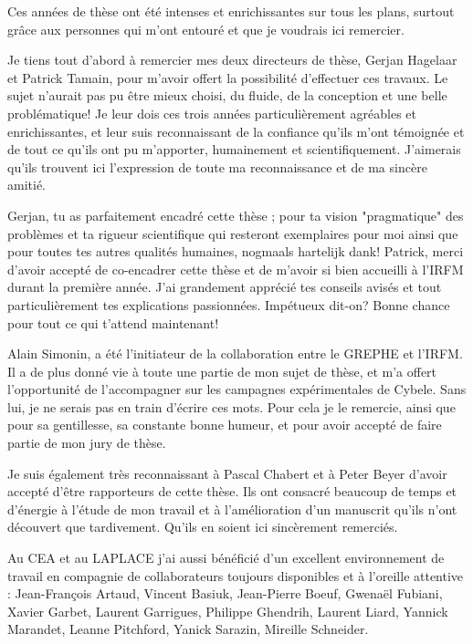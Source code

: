 \thispagestyle{preface}
\iffalse 
Ces années de thèse ont été intenses et enrichissantes sur tous
les plans, surtout grâce aux personnes qui m’ont entouré et que je voudrais ici
remercier.

Je tiens tout d'abord à remercier mes deux directeurs de thèse, Gerjan Hagelaar
et Patrick Tamain, pour m'avoir offert la possibilité d'effectuer ces travaux.
Le sujet n'aurait pas pu être mieux choisi, du fluide, de la conception et une
belle problématique! Je leur dois ces trois années
particulièrement agréables et enrichissantes, et leur suis reconnaissant de la
confiance qu'ils m'ont témoignée et de tout ce qu'ils ont pu m'apporter,
humainement et scientifiquement. J'aimerais qu'ils trouvent ici l'expression de toute ma
reconnaissance et de ma sincère amitié. 

Gerjan, tu as parfaitement encadré cette
thèse ; pour ta vision "pragmatique" des problèmes et ta rigueur
scientifique qui resteront exemplaires pour moi ainsi que pour toutes tes autres
qualités humaines, nogmaals hartelijk dank!
Patrick, merci d'avoir accepté de co-encadrer cette thèse et de m'avoir si bien
accueilli à l'IRFM durant la première année. J'ai grandement apprécié tes
conseils avisés et tout particulièrement tes explications passionnées.
Impétueux dit-on? Bonne chance pour tout ce qui t'attend maintenant!

Alain Simonin, a été l'initiateur de la collaboration entre le GREPHE et
l'IRFM. Il a de plus donné vie à toute une partie de mon sujet de
thèse, et m'a offert l'opportunité de l'accompagner sur les campagnes
expérimentales de Cybele. Sans lui, je ne serais pas en train d'écrire ces mots.
Pour cela je le remercie, ainsi que pour sa gentillesse, sa constante bonne
humeur, et pour avoir accepté de faire partie de mon jury de thèse.

Je suis également très reconnaissant à Pascal Chabert et à Peter Beyer d'avoir
accepté d'être rapporteurs de cette thèse. Ils ont consacré
beaucoup de temps et d'énergie à l'étude de mon travail et à l'amélioration d'un
manuscrit qu'ils n'ont découvert que tardivement. Qu'ils en soient ici
sincèrement remerciés.

Au CEA et au LAPLACE j’ai aussi bénéficié d’un excellent
environnement de travail en compagnie de collaborateurs toujours disponibles et
à l'oreille attentive :
Jean-François Artaud, Vincent Basiuk,
Jean-Pierre Boeuf,
Gwenaël Fubiani,
Xavier Garbet,
Laurent Garrigues,
Philippe Ghendrih, 
Laurent Liard,
Yannick Marandet,
Leanne Pitchford,
Yanick Sarazin,
Mireille Schneider. 


